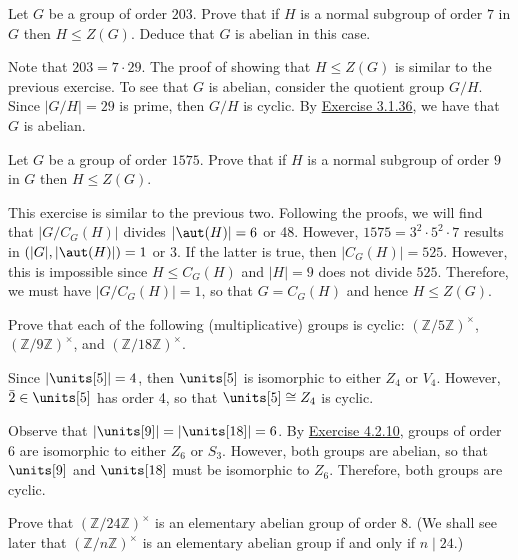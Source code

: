 \newpage

\begin{exercise}
	Let $G$ be a group of order $203$. Prove that if $H$ is a normal subgroup of order $7$ in $G$ then $H \le Z(G)$. Deduce that $G$ is abelian in this case.
\end{exercise}

\begin{sol}
	Note that $203 = 7 \cdot 29$. The proof of showing that $H \leq Z(G)$ is similar to the previous exercise. To see that $G$ is abelian, consider the quotient group $G/H$. Since $|G/H| = 29$ is prime, then $G/H$ is cyclic. By \hyperref[ex3.1.36]{Exercise 3.1.36}, we have that $G$ is abelian.
\end{sol}

\begin{exercise}
	Let $G$ be a group of order $1575$. Prove that if $H$ is a normal subgroup of order $9$ in $G$ then $H \le Z(G)$.
\end{exercise}

\begin{sol}
	This exercise is similar to the previous two. Following the proofs, we will find that $|G/C_G(H)|$ divides $|\aut(H)| = 6$ or 48. However, $1575 = 3^2 \cdot 5^2 \cdot 7$ results in $(|G|, |\aut(H)|) = 1$ or 3. If the latter is true, then $|C_G(H)| = 525$. However, this is impossible since $H \leq C_G(H)$ and $|H| = 9$ does not divide $525$. Therefore, we must have $|G/C_G(H)| = 1$, so that $G = C_G(H)$ and hence $H \leq Z(G)$.
\end{sol}

\begin{exercise}
	Prove that each of the following (multiplicative) groups is cyclic: $(\mathbb Z/5\mathbb Z)^\times$, $(\mathbb Z/9\mathbb Z)^\times$, and $(\mathbb Z/18\mathbb Z)^\times$.
\end{exercise}

\begin{sol}
	Since $|\units[5]| = 4$, then $\units[5]$ is isomorphic to either $Z_4$ or $V_4$. However, $\bar 2 \in \units[5]$ has order 4, so that $\units[5] \cong Z_4$ is cyclic.

	Observe that $|\units[9]| = |\units[18]| = 6$. By \hyperref[ex4.2.10]{Exercise 4.2.10}, groups of order 6 are isomorphic to either $Z_6$ or $S_3$. However, both groups are abelian, so that $\units[9]$ and $\units[18]$ must be isomorphic to $Z_6$. Therefore, both groups are cyclic.
\end{sol}

\begin{specialexercise}
	Prove that $(\mathbb Z/24\mathbb Z)^\times$ is an elementary abelian group of order $8$. (We shall see later that $(\mathbb Z/n\mathbb Z)^\times$ is an elementary abelian group if and only if $n \mid 24$.)
\end{specialexercise}

